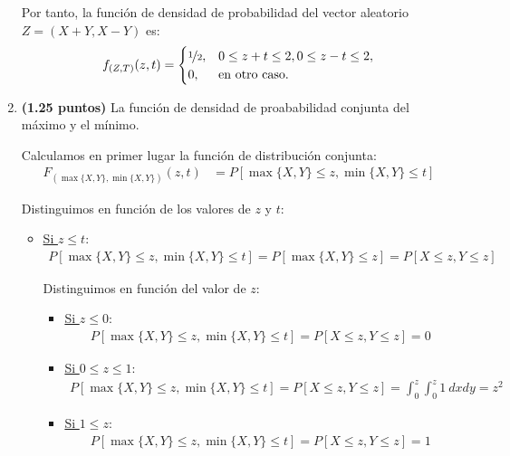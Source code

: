 \documentclass[12pt]{article}
\begin{document}
\begin{ejercicio}
\begin{enumerate}
            Por tanto, la función de densidad de probabilidad del vector aleatorio $Z = (X+Y,X-Y)$ es:
            \begin{equation*}
                f_{(Z,T)}(z,t) = \begin{cases}
                    \nicefrac{1}{2}, & 0\leq z+t\leq 2, 0\leq z-t\leq 2, \\
                    0, & \text{en otro caso}.
                \end{cases}
            \end{equation*}
            \item \textbf{(1.25 puntos)} La función de densidad de proababilidad conjunta del máximo y el mínimo.
            
            Calculamos en primer lugar la función de distribución conjunta:
            \begin{align*}
                F_{(\max\{X,Y\},\min\{X,Y\})}(z,t) &= P[\max\{X,Y\}\leq z, \min\{X,Y\}\leq t]
            \end{align*}

            Distinguimos en función de los valores de $z$ y $t$:
            \begin{itemize}
                \item \ul{Si $z\leq t$}:
                \begin{align*}
                    P[\max\{X,Y\}\leq z, \min\{X,Y\}\leq t]
                    = P[\max\{X,Y\}\leq z] = P[X\leq z, Y\leq z]
                \end{align*}

                Distinguimos en función del valor de $z$:
                \begin{itemize}
                    \item \ul{Si $z\leq 0$}:
                    \begin{align*}
                        P[\max\{X,Y\}\leq z, \min\{X,Y\}\leq t]
                        = P[X\leq z, Y\leq z] = 0
                    \end{align*}

                    \item \ul{Si $0\leq z\leq 1$}:
                    \begin{align*}
                        P[\max\{X,Y\}\leq z, \min\{X,Y\}\leq t]
                        = P[X\leq z, Y\leq z] = \int_0^z\int_0^z 1\ dxdy=z^2
                    \end{align*}

                    \item \ul{Si $1\leq z$}:
                    \begin{align*}
                        P[\max\{X,Y\}\leq z, \min\{X,Y\}\leq t]
                        = P[X\leq z, Y\leq z] = 1
                    \end{align*}
                \end{itemize}


\end{itemize}
\end{enumerate}
\end{ejercicio}
\end{document}
